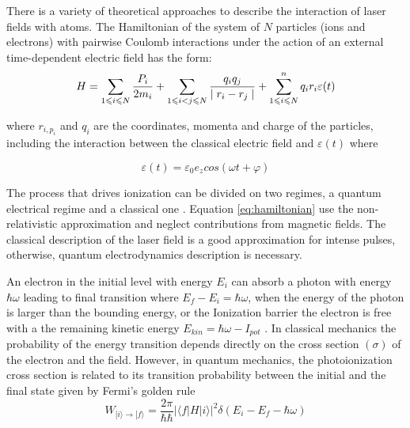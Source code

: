 There is a variety of theoretical approaches to describe the interaction of laser fields with atoms. The Hamiltonian of the system of $N$ particles (ions and electrons) with pairwise Coulomb interactions under the action of an external time-dependent electric field has the form:
\begin{equation}  \label{eq:hamiltonian}
\centering
H = \displaystyle\sum_{1 \leqslant i \leqslant N}^{} \dfrac{P_{i}}{2m_{i}} + \displaystyle\sum_{1 \leqslant i < j \leqslant N}^{} \dfrac{q_{i}q_{j}}{\mid r_{i}-r_{j} \mid} + \displaystyle\sum_{1 \leqslant i \leqslant N}^{n} q_{i}r_{i}\varepsilon(t)
\end{equation}

where $ r_{i,  p_{i}} $ and $ q_{i} $ are the coordinates, momenta and charge of the particles, including the interaction between the classical electric field and $ \varepsilon(t) $ where \cite{mikaberidze_atomic_1981}

\begin{equation}
\varepsilon(t) = \varepsilon_{0} e_{z}cos(\omega t + \varphi)
\end{equation}

The process that drives ionization can be divided on two regimes, a quantum electrical regime and a classical one \cite{karnakov_strong_2009}. Equation \ref{eq:hamiltonian} use the non-relativistic approximation and neglect contributions from magnetic fields. The classical description of the laser field is a good approximation for intense pulses, otherwise, quantum electrodynamics description is necessary.

An electron in the initial level with energy $E_{i}$ can absorb a photon with energy $\hbar \omega$ leading to final transition where $E_{f}-E_{i}=\hbar \omega$, when the energy of the photon is larger than the bounding energy, or the Ionization barrier the electron is free with a the remaining kinetic energy $E_{kin} = \hbar \omega - I_{pot}$ \cite{becker_vuv_1996}.
In classical mechanics the probability of the energy transition depends directly on the cross section $(\sigma)$ of the electron and the field. However, in quantum mechanics, the photoionization cross section is related to its transition probability between the initial and the final state given by Fermi’s golden rule
 \begin{equation} 
 \label{eq:transitionprobability}
W_{|i\rangle \rightarrow |f\rangle} = \frac{2\pi}{\hbar\hbar} |\langle f|H|i\rangle|^{2} \delta(E_{i} - E_{f}-\hbar\omega)
 \end{equation}
 
